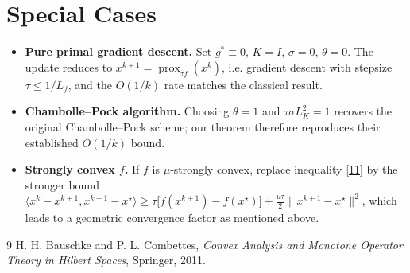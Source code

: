 \documentclass{article}
\begin{document}
\section*{Special Cases}
\begin{itemize}
  \item \textbf{Pure primal gradient descent.}  
    Set $g^{*}\equiv0$, $K=I$, $\sigma=0$, $\theta=0$.  The update reduces to $x^{k+1}= \operatorname{prox}_{\tau f}(x^{k})$, i.e. gradient descent with stepsize $\tau\le 1/L_f$, and the $O(1/k)$ rate matches the classical result.
  \item \textbf{Chambolle–Pock algorithm.}  
    Choosing $\theta=1$ and $\tau\sigma L_K^{2}=1$ recovers the original Chambolle–Pock scheme; our theorem therefore reproduces their established $O(1/k)$ bound.
  \item \textbf{Strongly convex $f$.}  
    If $f$ is $\mu$‑strongly convex, replace inequality \eqref{11} by the stronger bound  
    $\langle x^{k}-x^{k+1},x^{k+1}-x^{\star}\rangle
    \ge \tau\bigl[f(x^{k+1})-f(x^{\star})\bigr]
    +\frac{\mu\tau}{2}\|x^{k+1}-x^{\star}\|^{2}$,
    which leads to a geometric convergence factor as mentioned above.
\end{itemize}

\begin{thebibliography}{9}
H. H. Bauschke and P. L. Combettes,
\textit{Convex Analysis and Monotone Operator Theory in Hilbert Spaces},
Springer, 2011.
\end{thebibliography}
\end{document}
